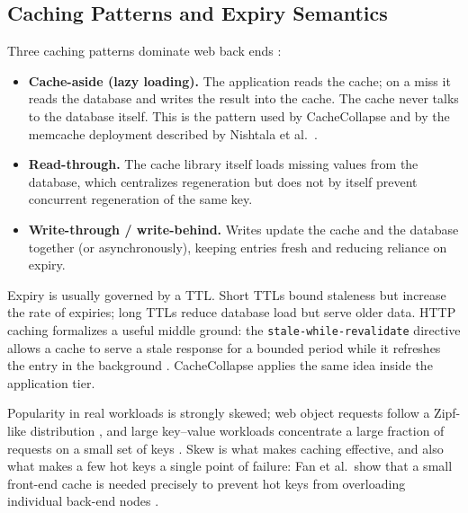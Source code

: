 \documentclass[preprint,12pt]{elsarticle}
\begin{document}
\subsection{Caching Patterns and Expiry Semantics}
\label{sec:bg-caching}
Three caching patterns dominate web back ends \cite{kleppmann2017}:
\begin{itemize}[leftmargin=*]
\item \textbf{Cache-aside (lazy loading).} The application reads the cache; on a miss
it reads the database and writes the result into the cache. The cache never talks to
the database itself. This is the pattern used by CacheCollapse and by the memcache
deployment described by Nishtala et al.\ \cite{nishtala2013}.
\item \textbf{Read-through.} The cache library itself loads missing values from the
database, which centralizes regeneration but does not by itself prevent concurrent
regeneration of the same key.
\item \textbf{Write-through / write-behind.} Writes update the cache and the database
together (or asynchronously), keeping entries fresh and reducing reliance on expiry.
\end{itemize}
Expiry is usually governed by a TTL. Short TTLs bound staleness but increase the
rate of expiries; long TTLs reduce database load but serve older data. HTTP caching
formalizes a useful middle ground: the \texttt{stale-while-revalidate} directive
allows a cache to serve a stale response for a bounded period while it refreshes the
entry in the background \cite{rfc5861}. CacheCollapse applies the same idea inside
the application tier.

Popularity in real workloads is strongly skewed; web object requests follow a
Zipf-like distribution \cite{breslau1999}, and large key--value workloads concentrate
a large fraction of requests on a small set of keys \cite{atikoglu2012}. Skew is what
makes caching effective, and also what makes a few hot keys a single point of
failure: Fan et al.\ show that a small front-end cache is needed precisely to prevent
hot keys from overloading individual back-end nodes \cite{fan2011}.
\end{document}
